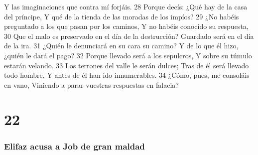 Y las imaginaciones que contra mí forjáis.  
28 Porque decís: ¿Qué hay de la casa del príncipe,  
Y qué de la tienda de las moradas de los impíos?  
29 ¿No habéis preguntado a los que pasan por los caminos,  
Y no habéis conocido su respuesta,  
30 Que el malo es preservado en el día de la destrucción?  
Guardado será en el día de la ira.  
31 ¿Quién le denunciará en su cara su camino?  
Y de lo que él hizo, ¿quién le dará el pago?  
32 Porque llevado será a los sepulcros,  
Y sobre su túmulo estarán velando.  
33 Los terrones del valle le serán dulces;  
Tras de él será llevado todo hombre,  
Y antes de él han ido innumerables.  
34 ¿Cómo, pues, me consoláis en vano,  
Viniendo a parar vuestras respuestas en falacia? 
  

\chapter{22}

\subsection*{Elifaz acusa a Job de gran maldad}  

